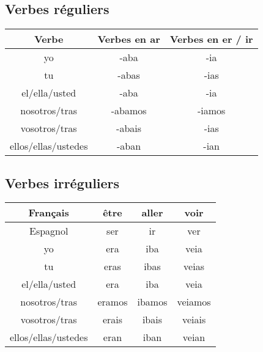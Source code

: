 \subsection{Verbes réguliers}
\begin{table}[hbt!]
    \centering
    \setlength\tabcolsep{20pt}
    \begin{tabular}{|c||c|c|}
         \hline
         Verbe              & Verbes en \textbf{ar} & Verbes en \textbf{er} / \textbf{ir} \\
         \hline
         \hline
         yo                 & -aba              & -ia          \\    
         \hline
         tu                 & -abas           & -ias           \\
         \hline
         el/ella/usted      & -aba              & -ia          \\
        \hline
        nosotros/tras       & -abamos           & -iamos       \\
        \hline
        vosotros/tras       & -abais         & -ias            \\
        \hline
        ellos/ellas/ustedes & -aban           & -ian           \\
        \hline
    \end{tabular}
    \label{tab:label2}
\end{table}
\subsection{Verbes irréguliers}
\begin{table}[hbt!]
    \centering
    \setlength\tabcolsep{26pt}
    \begin{tabular}{|c||c|c|c|}
         \hline
         Français               & \textcolor{BrickRed}{être} & \textcolor{BrickRed}{aller} & \textcolor{BrickRed}{voir} \\
         \hline
         Espagnol               & \textcolor{electricultramarine}{ser} & \textcolor{electricultramarine}{ir} & \textcolor{electricultramarine}{ver} \\
         \hline
         \hline
         yo                     & era            & iba         & veia       \\    
         \hline
         tu                     & eras         & ibas      & veias     \\
         \hline
         el/ella/usted          & era           & iba         & veia          \\
        \hline
        nosotros/tras           & eramos         & ibamos      & veiamos       \\
        \hline
        vosotros/tras           & erais       & ibais    & veiais    \\
        \hline
        ellos/ellas/ustedes     & eran        & iban      & veian    \\
        \hline
    \end{tabular}
    \label{tab:label2}
\end{table}
\newpage
